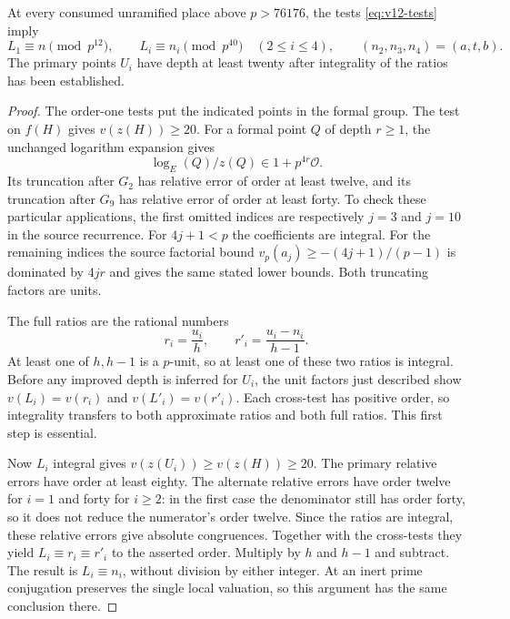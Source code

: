 \begin{lemma}\label{lem:v12-mixed-local}
At every consumed unramified place above $p>76176$, the tests
\eqref{eq:v12-tests} imply
\[
 L_1\equiv n\pmod {p^{12}},\qquad
 L_i\equiv n_i\pmod {p^{40}}\quad(2\le i\le4),
 \qquad(n_2,n_3,n_4)=(a,t,b).
\]
The primary points $U_i$ have depth at least twenty after integrality
of the ratios has been established.
\end{lemma}
\begin{proof}
The order-one tests put the indicated points in the formal group.
The test on $f(H)$ gives $v(z(H))\ge20$.  For a formal point $Q$ of
depth $r\ge1$, the unchanged logarithm expansion gives
\[
 \log_E(Q)/z(Q)\in1+p^{4r}\mathcal O.
\]
Its truncation after $G_2$ has relative error of order at least twelve,
and its truncation after $G_9$ has relative error of order at least
forty.  To check these particular applications, the first omitted
indices are respectively $j=3$ and $j=10$ in the source recurrence.
For $4j+1<p$ the coefficients are integral.  For the remaining indices
the source factorial bound
$v_p(a_j)\ge-(4j+1)/(p-1)$ is dominated by $4jr$ and gives the same
stated lower bounds.  Both truncating factors are units.

The full ratios are the rational numbers
\[
 r_i=\frac{u_i}{h},\qquad r'_i=\frac{u_i-n_i}{h-1}.
\]
At least one of $h,h-1$ is a $p$-unit, so at least one of these two
ratios is integral.  Before any improved depth is inferred for $U_i$,
the unit factors just described show
$v(L_i)=v(r_i)$ and $v(L'_i)=v(r'_i)$.  Each cross-test has positive
order, so integrality transfers to both approximate ratios and both
full ratios.  This first step is essential.

Now $L_i$ integral gives $v(z(U_i))\ge v(z(H))\ge20$.
The primary relative errors have order at least eighty.  The alternate
relative errors have order twelve for $i=1$ and forty for $i\ge2$:
in the first case the denominator still has order forty, so it does
not reduce the numerator's order twelve.  Since the ratios are
integral, these relative errors give absolute congruences.  Together
with the cross-tests they yield $L_i\equiv r_i\equiv r'_i$ to the
asserted order.  Multiply by $h$ and $h-1$ and subtract.  The result
is $L_i\equiv n_i$, without division by either integer.  At an inert
prime conjugation preserves the single local valuation, so this
argument has the same conclusion there.
\end{proof}


